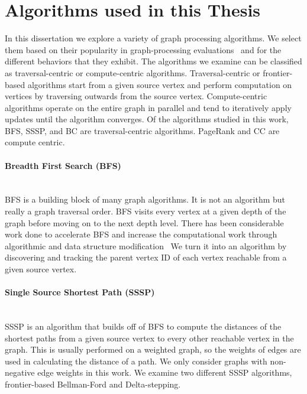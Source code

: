 \section{Algorithms used in this Thesis}\label{thesis:background:algorithms}
In this dissertation we explore a variety of graph processing algorithms. 
We select them based on their popularity in graph-processing evaluations~\cite{beamer2016thesis} and for the different behaviors that they exhibit.
The algorithms we examine can be classified as traversal-centric or compute-centric algorithms. 
Traversal-centric or frontier-based algorithms start from a given source vertex and perform computation on vertices by traversing outwards from the source vertex.
Compute-centric algorithms operate on the entire graph in parallel and tend to iteratively apply updates until the algorithm converges.
Of the algorithms studied in this work, BFS, SSSP, and BC are traversal-centric algorithms.
PageRank and CC are compute centric.

\paragraph{Breadth First Search (BFS)}\mbox{}\\
BFS is a building block of many graph algorithms. 
It is not an algorithm but really a graph traversal order. 
BFS visits every vertex at a given depth of the graph before moving on to the next depth level.
There has been considerable work done to accelerate BFS and increase the computational work through algorithmic and data structure modification~\cite{agarwal2010scalable,beamer-bfs-direction,bulucc2011parallel,hong2011efficient,yoo2005scalable}
We turn it into an algorithm by discovering and tracking the parent vertex ID of each vertex reachable from a given source vertex.

\paragraph{Single Source Shortest Path (SSSP)}\mbox{}\\
SSSP is an algorithm that builds off of BFS to compute the distances of the shortest paths from a given source vertex to every other reachable vertex in the graph.
This is usually performed on a weighted graph, so the weights of edges are used in calculating the distance of a path.
We only consider graphs with non-negative edge weights in this work.
We examine two different SSSP algorithms, frontier-based Bellman-Ford and Delta-stepping.

